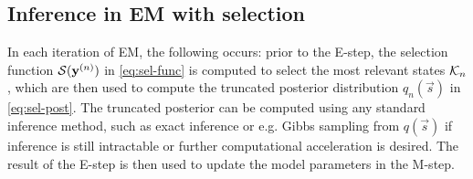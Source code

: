 

\subsection{Inference in EM with selection}
%
In each iteration of EM, the following occurs: 
prior to the E-step, the selection function $\mathcal{S}({\mathbf{y}}^{(n)})$ in \eqref{eq:sel-func} is computed to select the most relevant states $\mathcal{K}_{n}$, 
which are then used to compute the truncated posterior distribution $q_n(\vec{s})$ in \eqref{eq:sel-post}.
The truncated posterior can be computed using any standard inference method, 
such as exact inference or e.g. Gibbs sampling from $q(\vec{s})$  %
if inference is still intractable or further computational acceleration is desired.
The result of the E-step is then used to update the model parameters  in the M-step. 



